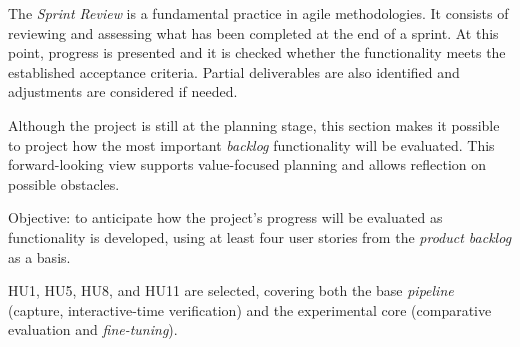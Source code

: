 \documentclass[
  11pt, %
]{charter}
\begin{document}
The \textit{Sprint Review} is a fundamental practice in agile methodologies. It consists of reviewing and assessing what has been completed at the end of a sprint. At this point, progress is presented and it is checked whether the functionality meets the established acceptance criteria. Partial deliverables are also identified and adjustments are considered if needed.

Although the project is still at the planning stage, this section makes it possible to project how the most important \textit{backlog} functionality will be evaluated. This forward-looking view supports value-focused planning and allows reflection on possible obstacles.

Objective: to anticipate how the project's progress will be evaluated as functionality is developed, using at least four user stories from the \textit{product backlog} as a basis.

HU1, HU5, HU8, and HU11 are selected, covering both the base \textit{pipeline} (capture, interactive-time verification) and the experimental core (comparative evaluation and \textit{fine-tuning}).
\end{document}
